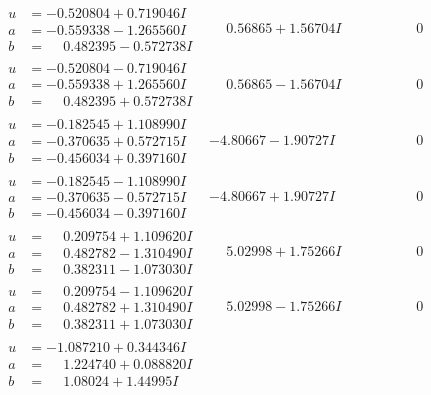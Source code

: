 \documentclass[1p]{elsarticle_modified}
\theoremstyle{definition}
\begin{document}
$$\begin{array}{c|c|c}
\begin{aligned}
u &= -0.520804 + 0.719046 I \\
a &= -0.559338 - 1.265560 I \\
b &= \phantom{-}0.482395 - 0.572738 I\end{aligned}
 & \phantom{-}0.56865 + 1.56704 I & \phantom{-0.000000 } 0 \\ \hline\begin{aligned}
u &= -0.520804 - 0.719046 I \\
a &= -0.559338 + 1.265560 I \\
b &= \phantom{-}0.482395 + 0.572738 I\end{aligned}
 & \phantom{-}0.56865 - 1.56704 I & \phantom{-0.000000 } 0 \\ \hline\begin{aligned}
u &= -0.182545 + 1.108990 I \\
a &= -0.370635 + 0.572715 I \\
b &= -0.456034 + 0.397160 I\end{aligned}
 & -4.80667 - 1.90727 I & \phantom{-0.000000 } 0 \\ \hline\begin{aligned}
u &= -0.182545 - 1.108990 I \\
a &= -0.370635 - 0.572715 I \\
b &= -0.456034 - 0.397160 I\end{aligned}
 & -4.80667 + 1.90727 I & \phantom{-0.000000 } 0 \\ \hline\begin{aligned}
u &= \phantom{-}0.209754 + 1.109620 I \\
a &= \phantom{-}0.482782 - 1.310490 I \\
b &= \phantom{-}0.382311 - 1.073030 I\end{aligned}
 & \phantom{-}5.02998 + 1.75266 I & \phantom{-0.000000 } 0 \\ \hline\begin{aligned}
u &= \phantom{-}0.209754 - 1.109620 I \\
a &= \phantom{-}0.482782 + 1.310490 I \\
b &= \phantom{-}0.382311 + 1.073030 I\end{aligned}
 & \phantom{-}5.02998 - 1.75266 I & \phantom{-0.000000 } 0 \\ \hline\begin{aligned}
u &= -1.087210 + 0.344346 I \\
a &= \phantom{-}1.224740 + 0.088820 I \\
b &= \phantom{-}1.08024 + 1.44995 I\end{aligned}

\end{array}$$
\end{document}
